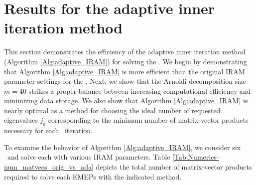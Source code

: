 \section{Results for the adaptive inner iteration method} 			\label{Subsec:Numerics-adaptive_IRAM_figs_and_tables}




This section demonstrates the efficiency of the adaptive inner iteration method (Algorithm \ref{Alg:adaptive_IRAM}) for solving the \emep.
We begin by demonstrating that Algorithm \ref{Alg:adaptive_IRAM} is more efficient than the original IRAM parameter settings for the \emep.
Next, we show that the Arnoldi decomposition size $m=40$ strikes a proper balance between increasing computational efficiency and minimizing data storage.
We also show that Algorithm \ref{Alg:adaptive_IRAM} is nearly optimal as a method for choosing the ideal number of requested eigenvalues $j_k$ corresponding to the minimum number of matrix-vector products necessary for each \emep \ iteration.







To examine the behavior of Algorithm \ref{Alg:adaptive_IRAM}, we consider six \emeps \ and solve each with various IRAM parameters. 
Table \ref{Tab:Numerics-num_matvecs_orig_vs_ada} depicts the total number of matrix-vector products required to solve each EMEPs with the indicated method.


